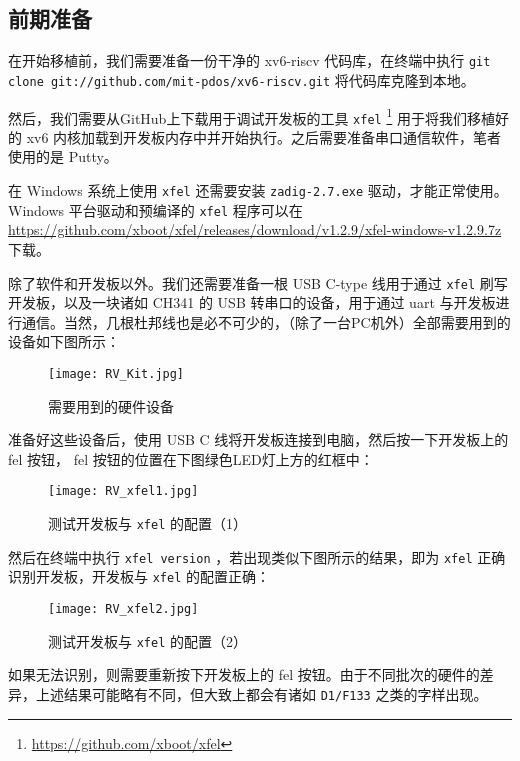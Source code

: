 \subsection{前期准备}

在开始移植前，我们需要准备一份干净的 xv6-riscv 代码库，在终端中执行 \lstinline{git clone git://github.com/mit-pdos/xv6-riscv.git} 将代码库克隆到本地。

然后，我们需要从GitHub上下载用于调试开发板的工具 \lstinline{xfel} \footnote{\url{https://github.com/xboot/xfel}} 用于将我们移植好的 xv6 内核加载到开发板内存中并开始执行。之后需要准备串口通信软件，笔者使用的是 Putty。

\begin{theorem}
    在 Windows 系统上使用 \lstinline{xfel} 还需要安装 \lstinline{zadig-2.7.exe} 驱动，才能正常使用。Windows 平台驱动和预编译的 \lstinline{xfel} 程序可以在 \url{https://github.com/xboot/xfel/releases/download/v1.2.9/xfel-windows-v1.2.9.7z} 下载。
\end{theorem}

除了软件和开发板以外。我们还需要准备一根 USB C-type 线用于通过 \lstinline{xfel} 刷写开发板，以及一块诸如 CH341 的 USB 转串口的设备，用于通过 uart 与开发板进行通信。当然，几根杜邦线也是必不可少的，（除了一台PC机外）全部需要用到的设备如下图所示：

\begin{figure}[H]
  \centering
  \texttt{[image: RV\_Kit.jpg]}
  \caption{ 需要用到的硬件设备 }
\end{figure}

准备好这些设备后，使用 USB C 线将开发板连接到电脑，然后按一下开发板上的 fel 按钮， fel 按钮的位置在下图绿色LED灯上方的红框中：

\begin{figure}[H]
    \centering
    \texttt{[image: RV\_xfel1.jpg]}
    \caption{ 测试开发板与 \lstinline{xfel} 的配置（1） }
\end{figure}

然后在终端中执行 \lstinline{xfel version} ，若出现类似下图所示的结果，即为 \lstinline{xfel} 正确识别开发板，开发板与 \lstinline{xfel} 的配置正确：
\begin{figure}[H]
    \centering
    \texttt{[image: RV\_xfel2.jpg]}
    \caption{ 测试开发板与 \lstinline{xfel} 的配置（2） }
\end{figure}

如果无法识别，则需要重新按下开发板上的 fel 按钮。由于不同批次的硬件的差异，上述结果可能略有不同，但大致上都会有诸如 \lstinline{D1/F133} 之类的字样出现。

